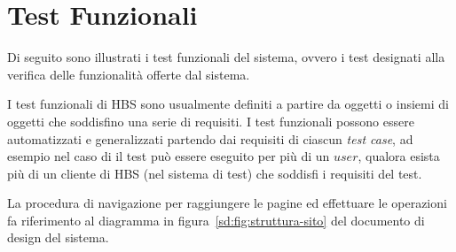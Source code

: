 
\section{Test Funzionali}

Di seguito sono illustrati i test funzionali del sistema, ovvero i test designati alla verifica delle funzionalità offerte dal sistema.

I test funzionali di HBS sono usualmente definiti a partire da oggetti o insiemi di oggetti che soddisfino una serie di requisiti.
I test funzionali possono essere automatizzati e generalizzati partendo dai requisiti di ciascun \emph{test case}, ad esempio nel caso di \idtpVERSAL il test pu\`o essere eseguito per pi\`u di un $user$, qualora esista pi\`u di un cliente di HBS (nel sistema di test) che soddisfi i requisiti del test.

La procedura di navigazione per raggiungere le pagine ed effettuare le operazioni fa riferimento al diagramma in figura~\ref{sd:fig:struttura-sito} del documento di design del sistema.



